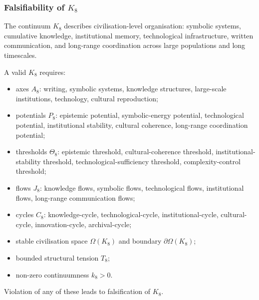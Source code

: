 
\subsubsection{Falsifiability of \texorpdfstring{$K_8$}{K_8}}
\label{sec:falsifiability-k8}

The continuum $K_8$ describes civilisation-level organisation:
symbolic systems, cumulative knowledge, institutional memory,
technological infrastructure, written communication,
and long-range coordination across large populations and long timescales.

A valid $K_8$ requires:

\begin{itemize}
    \item axes $A_8$: writing, symbolic systems, knowledge structures,
          large-scale institutions, technology, cultural reproduction;
    \item potentials $P_8$: epistemic potential, symbolic-energy potential,
          technological potential, institutional stability,
          cultural coherence, long-range coordination potential;
    \item thresholds $\Theta_8$: epistemic threshold,
          cultural-coherence threshold,
          institutional-stability threshold,
          technological-sufficiency threshold,
          complexity-control threshold;
    \item flows $J_8$: knowledge flows, symbolic flows,
          technological flows, institutional flows,
          long-range communication flows;
    \item cycles $C_8$: knowledge-cycle, technological-cycle,
          institutional-cycle, cultural-cycle,
          innovation-cycle, archival-cycle;
    \item stable civilisation space $\Omega(K_8)$ and boundary $\partial\Omega(K_8)$;
    \item bounded structural tension $T_8$;
    \item non-zero continuumness $k_8>0$.
\end{itemize}

Violation of any of these leads to falsification of $K_8$.




